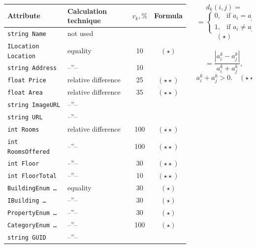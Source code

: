 \documentclass[10pt,dvipsnames]{beamer}
\begin{document}
\begin{frame}
 \begin{columns}
    \begin{column}{0.8\linewidth}
\begin{table}[tb]
  \footnotesize
  \centering
  \begin{tabular}{|l|l|c|c|}
    \hline
    Attribute & Calculation technique & $v_k, \%$ & Formula \\
    \hline
\texttt{string Name} & not used & & \\
    \texttt{ILocation Location} & equality & 10 & $(\star)$
    \\
\texttt{string Address} & --''-- & 10 & \\
\texttt{float Price} & relative difference & 25 & $(\star\star)$\\
\texttt{float Area} & relative difference  & 35 & $(\star\star)$\\
\texttt{string ImageURL} & --''-- & & \\
\texttt{string URL} & --''-- & & \\
\texttt{int Rooms}  & relative difference  & 100 & $(\star\star)$\\
\texttt{int RoomsOffered} &  --''--   & 100 & $(\star\star)$\\
\texttt{int Floor}  &  --''--   & 30 & $(\star\star)$\\
\texttt{int FloorTotal}  &  --''--   & 10 & $(\star\star)$\\
\texttt{BuildingEnum \ldots}  & equality & 30 & $(\star)$\\
\texttt{IBuilding \ldots{}}  & --''-- & 30 &  $(\star)$\\
\texttt{PropertyEnum \ldots} & --''-- & 30 &  $(\star)$\\
\texttt{CategoryEnum \ldots} & --''-- & 100 &  $(\star)$\\
    \texttt{string GUID} & --''-- & & \\
    \hline
  \end{tabular}
  \end{table}
 \end{column}
\begin{column}{0.2\linewidth}\footnotesize
\[
  d_k(i,j) =
\]
\[
 =\left\{
                                                          \begin{array}{ll}
                                                            0, & \mbox{if\ \ } a_i=a_j,\\
                                                            1, & \mbox{if\ \ } a_i\neq a_j,
                                                          \end{array}
                                                        \right.
                                                      \]
                                                  \[
  (\star)
\]
\\[2em]
\[
  = \frac{|a_i^k-a_j^k|}{a_i^k+a_j^k},\] \[ a_i^k+a_j^k>0.
  \quad (\star\star)
\]
\end{column}
\end{columns}


\end{frame}
\end{document}
